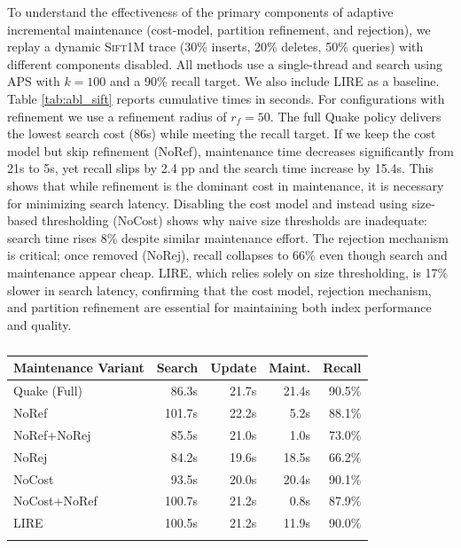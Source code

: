 To understand the effectiveness of the primary components of adaptive incremental maintenance (cost-model, partition refinement, and rejection), we replay a dynamic \textsc{Sift1M} trace (30\% inserts, 20\% deletes, 50\% queries) with different components disabled. All methods use a single-thread and search using APS with $k{=}100$ and a 90\% recall target. We also include LIRE as a baseline. Table \ref{tab:abl_sift} reports cumulative times in seconds. For configurations with refinement we use a refinement radius of $r_f=50$. The full Quake policy delivers the lowest search cost (86s) while meeting the recall target. If we keep the cost model but skip refinement (NoRef), maintenance time decreases significantly from 21s to 5s, yet recall slips by 2.4 pp and the search time increase by 15.4s. This shows that while refinement is the dominant cost in maintenance, it is necessary for minimizing search latency. Disabling the cost model and instead using size-based thresholding (NoCost) shows why naive size thresholds are inadequate: search time rises 8\% despite similar maintenance effort. The rejection mechanism is critical; once removed (NoRej), recall collapses to 66\% even though search and maintenance appear cheap. LIRE, which relies solely on size thresholding, is 17\% slower in search latency, confirming that the cost model, rejection mechanism, and partition refinement are essential for maintaining both index performance and quality.

\begin{table}[h]
\footnotesize
\centering
\caption{}
\label{tab:abl_sift}
\begin{tabular}{lrrrr}
\toprule
Maintenance Variant & Search & Update & Maint. & Recall \\
\midrule
Quake (Full)           & 86.3s & 21.7s & 21.4s & 90.5\% \\
NoRef            & 101.7s & 22.2s &  5.2s & 88.1\% \\
NoRef+NoRej      & 85.5s  & 21.0s &  1.0s & 73.0\% \\
NoRej            & 84.2s  & 19.6s & 18.5s & 66.2\% \\
NoCost           & 93.5s  & 20.0s & 20.4s & 90.1\% \\
NoCost+NoRef     & 100.7s & 21.2s &  0.8s & 87.9\% \\
\midrule
LIRE             & 100.5s & 21.2s & 11.9s & 90.0\% \\
\bottomrule
\label{tab:maintenance_ablation}
\end{tabular}
\end{table}

